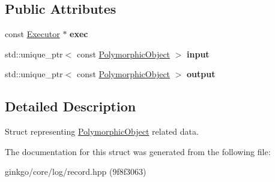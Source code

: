 \subsection*{Public Attributes}
\begin{DoxyCompactItemize}
\item 
\mbox{\label{structgko_1_1log_1_1polymorphic__object__data_a673a2c661ae7c582475d044cf37a8ec2}} 
const \hyperlink{classgko_1_1Executor}{Executor} $\ast$ {\bfseries exec}
\item 
\mbox{\label{structgko_1_1log_1_1polymorphic__object__data_a835d796a090caae61492e27e657e09d8}} 
std\+::unique\+\_\+ptr$<$ const \hyperlink{classgko_1_1PolymorphicObject}{Polymorphic\+Object} $>$ {\bfseries input}
\item 
\mbox{\label{structgko_1_1log_1_1polymorphic__object__data_a47d7c908e465c205de05fc7e4aac7613}} 
std\+::unique\+\_\+ptr$<$ const \hyperlink{classgko_1_1PolymorphicObject}{Polymorphic\+Object} $>$ {\bfseries output}
\end{DoxyCompactItemize}


\subsection{Detailed Description}
Struct representing \hyperlink{classgko_1_1PolymorphicObject}{Polymorphic\+Object} related data. 

The documentation for this struct was generated from the following file\+:\begin{DoxyCompactItemize}
\item 
ginkgo/core/log/record.\+hpp (9f8f3063)\end{DoxyCompactItemize}
